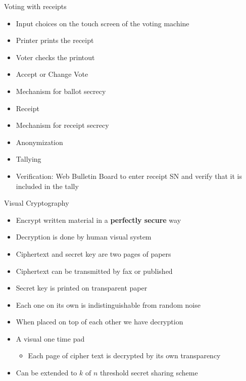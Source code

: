 \documentclass{beamer}
\begin{document}
\begin{frame}{Voting with receipts}
\begin{itemize}
\item Input choices on the touch screen of the voting machine
\item Printer prints the receipt
\item Voter checks the printout
\item Accept or Change Vote
\item Mechanism for ballot secrecy
\item Receipt
\item Mechanism for receipt secrecy
\item Anonymization
\item Tallying
\item Verification: Web Bulletin Board to enter receipt SN and verify that it is included in the tally
\end{itemize}
\end{frame}

\begin{frame}{Visual Cryptography }
\begin{itemize}
\item Encrypt written material in a \textbf{perfectly secure} way
\item Decryption is done by human visual system
\item Ciphertext and secret key are two pages of papers
\item Ciphertext can be transmitted by fax or published
\item Secret key is printed on transparent paper
\item Each one on its own is indistinguishable from random noise
\item When placed on top of each other we have decryption
\item A visual one time pad
\begin{itemize}
\item Each page of cipher text is decrypted by its own transparency
\end{itemize}
\item Can be extended to $k \text{ of } n$ threshold secret sharing scheme \cite{naor1995visual}
\end{itemize}
\end{frame}
\end{document}

